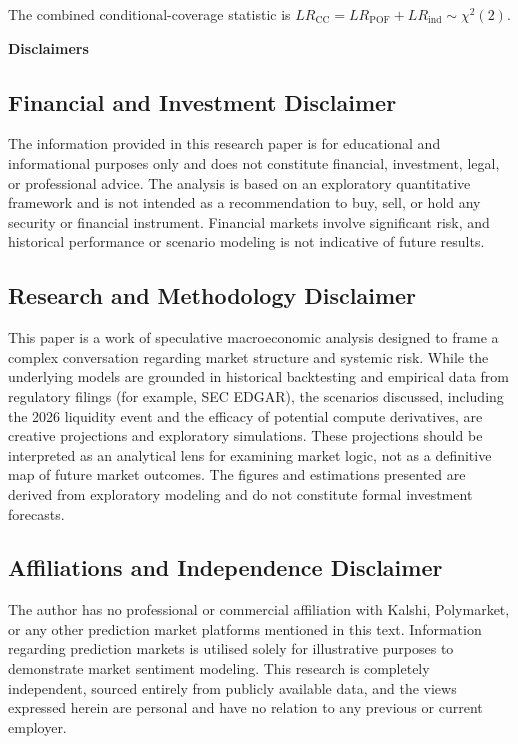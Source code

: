 \documentclass[11pt]{article}
\begin{document}
The combined conditional-coverage statistic is
$LR_{\text{CC}} = LR_{\text{POF}} + LR_{\text{ind}} \sim \chi^2(2)$.

\clearpage
\thispagestyle{plain}

\begin{center}
  {\Large\bfseries Disclaimers}
\end{center}

\vspace{4pt}

\subsection*{Financial and Investment Disclaimer}

The information provided in this research paper is for educational and informational
purposes only and does not constitute financial, investment, legal, or professional
advice. The analysis is based on an exploratory quantitative framework and is not
intended as a recommendation to buy, sell, or hold any security or financial
instrument. Financial markets involve significant risk, and historical performance or
scenario modeling is not indicative of future results.

\subsection*{Research and Methodology Disclaimer}

This paper is a work of speculative macroeconomic analysis designed to frame a complex
conversation regarding market structure and systemic risk. While the underlying models
are grounded in historical backtesting and empirical data from regulatory filings
(for example, SEC EDGAR), the scenarios discussed, including the 2026 liquidity event
and the efficacy of potential compute derivatives, are creative projections and
exploratory simulations. These projections should be interpreted as an analytical lens
for examining market logic, not as a definitive map of future market outcomes. The
figures and estimations presented are derived from exploratory modeling and do not
constitute formal investment forecasts.

\subsection*{Affiliations and Independence Disclaimer}

The author has no professional or commercial affiliation with Kalshi, Polymarket, or
any other prediction market platforms mentioned in this text. Information regarding
prediction markets is utilised solely for illustrative purposes to demonstrate market
sentiment modeling. This research is completely independent, sourced entirely from
publicly available data, and the views expressed herein are personal and have no
relation to any previous or current employer.
\end{document}
